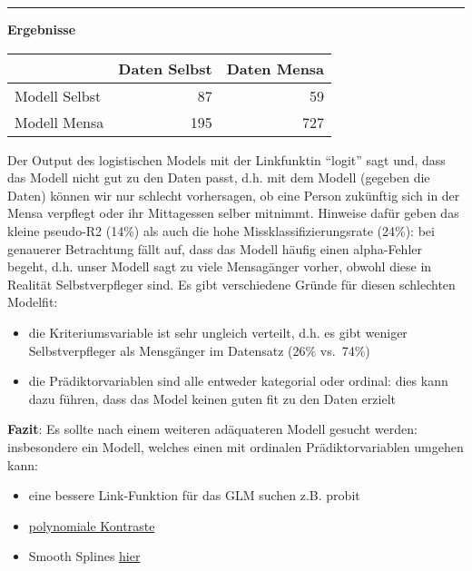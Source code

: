 \documentclass[
]{article}
\providecommand{\tightlist}{%
  \setlength{\itemsep}{0pt}\setlength{\parskip}{0pt}}
\begin{document}
\begin{center}\rule{0.5\linewidth}{0.5pt}\end{center}

\textbf{Ergebnisse}

\begin{longtable}[]{@{}lrr@{}}
\toprule
& Daten Selbst & Daten Mensa\tabularnewline
\midrule
\endhead
Modell Selbst & 87 & 59\tabularnewline
Modell Mensa & 195 & 727\tabularnewline
\bottomrule
\end{longtable}

Der Output des logistischen Models mit der Linkfunktin ``logit'' sagt
und, dass das Modell nicht gut zu den Daten passt, d.h. mit dem Modell
(gegeben die Daten) können wir nur schlecht vorhersagen, ob eine Person
zukünftig sich in der Mensa verpflegt oder ihr Mittagessen selber
mitnimmt. Hinweise dafür geben das kleine pseudo-R2 (14\%) als auch die
hohe Missklassifizierungsrate (24\%): bei genauerer Betrachtung fällt
auf, dass das Modell häufig einen alpha-Fehler begeht, d.h. unser Modell
sagt zu viele Mensagänger vorher, obwohl diese in Realität
Selbstverpfleger sind. Es gibt verschiedene Gründe für diesen schlechten
Modelfit:

\begin{itemize}
\tightlist
\item
  die Kriteriumsvariable ist sehr ungleich verteilt, d.h. es gibt
  weniger Selbstverpfleger als Mensgänger im Datensatz (26\% vs.~74\%)
\item
  die Prädiktorvariablen sind alle entweder kategorial oder ordinal:
  dies kann dazu führen, dass das Model keinen guten fit zu den Daten
  erzielt
\end{itemize}

\textbf{Fazit}: Es sollte nach einem weiteren adäquateren Modell gesucht
werden: insbesondere ein Modell, welches einen mit ordinalen
Prädiktorvariablen umgehen kann:

\begin{itemize}
\tightlist
\item
  eine bessere Link-Funktion für das GLM suchen z.B. probit
\item
  \href{https://stats.stackexchange.com/questions/195246/how-to-handle-ordinal-categorical-variable-as-independent-variable}{polynomiale
  Kontraste}
\item
  Smooth Splines
  \href{https://www.frontiersin.org/articles/10.3389/fams.2017.00015/full}{hier}
\end{itemize}
\end{document}
